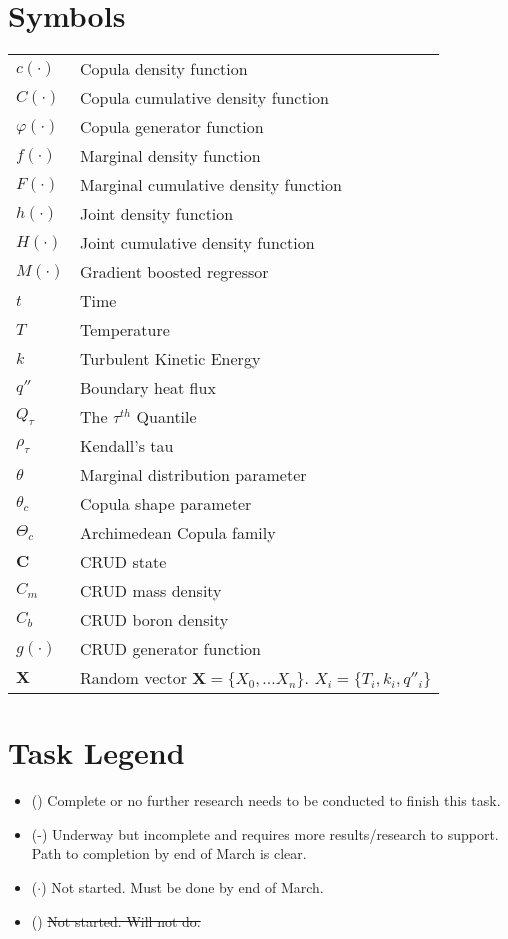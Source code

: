 \section*{Symbols}
\begin{tabular}{l l}
$c(\cdot)$ & Copula density function \\
$C(\cdot)$ & Copula cumulative density function \\
$\varphi(\cdot)$ & Copula generator function \\
$f(\cdot)$ & Marginal density function \\
$F(\cdot)$ & Marginal cumulative density function \\
$h(\cdot)$ & Joint density function \\
$H(\cdot)$ & Joint cumulative density function \\
$M(\cdot)$ & Gradient boosted regressor \\
$t$ & Time \\
$T$ & Temperature \\
$k$ & Turbulent Kinetic Energy \\
$q''$ & Boundary heat flux \\
$Q_{\tau}$ & The $\tau^{th}$ Quantile \\
$\rho_{\tau}$ & Kendall's tau \\
$\theta$ & Marginal distribution parameter \\
$\theta_c$ & Copula shape parameter \\
$\Theta_c$ & Archimedean Copula family \\
$\mathbf C$ & CRUD state \\
$C_m$ & CRUD mass density \\
$C_b$ & CRUD boron density \\
$g(\cdot)$ & CRUD generator function \\
$\mathbf X$ & Random vector $\mathbf X = \{X_0, ... X_n\}$.  $X_i = \{T_i, k_i, q''_i\}$ \\
\end{tabular}


\section*{Task Legend}

\begin{itemize}
    \item (\checkmark)  Complete or no further research needs to be conducted to finish this task.
    \item (\checkmark-)  Underway but incomplete and requires more results/research to support.  Path to completion by end of March is clear.
    \item ($\cdot$)  Not started.  Must be done by end of March.
    \item (\xmark)  \sout{Not started.  Will not do.}
\end{itemize}

\pagebreak

